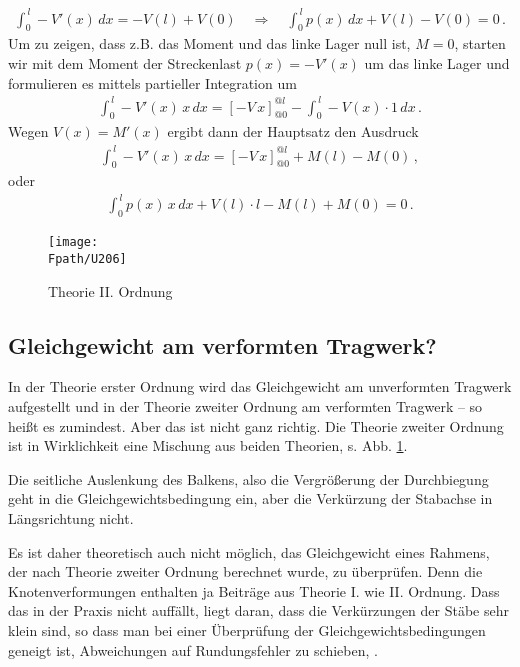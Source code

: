 {{{{{\begin{align}
\int_0^{\,l} -V'(x)\,dx = - V(l) + V(0)\quad \Rightarrow \quad \int_0^{\,l} p(x)\,dx + V(l) - V(0) = 0\,.
\end{align}
Um zu zeigen, dass z.B. das Moment und das linke Lager null ist, $M = 0$, starten wir mit dem Moment der Streckenlast $p(x) = - V'(x)$ um das linke Lager und formulieren es mittels partieller Integration um
\begin{align}
\int_0^{\,l} - V'(x)\,x\,dx = [-V\,x]_{@0}^{@l} - \int_0^{\,l} -V(x)\cdot 1\,dx\,.
\end{align}
Wegen $V(x) = M'(x)$ ergibt dann der Hauptsatz den Ausdruck
\begin{align}
\int_0^{\,l} - V'(x)\,x\,dx = [-V\,x]_{@0}^{@l} + M(l) - M(0)\,,
\end{align}
oder
\begin{align}
\int_0^{\,l} p(x)\,x\,dx + V(l)\cdot l -  M(l) + M(0) = 0\,.
\end{align}
\begin{figure}[tbp]
\centering
\if {} \sidecaption \fi
\centering
\texttt{[image: \\Fpath/U206]}
\caption{Theorie II. Ordnung}
\label{U206}%
\end{figure}%

{\textcolor{sectionTitleBlue}{\section{Gleichgewicht am verformten Tragwerk?}}}
In der Theorie erster Ordnung wird das Gleichgewicht am unverformten Tragwerk aufgestellt und in der Theorie zweiter Ordnung am verformten Tragwerk -- so hei{\ss}t es zumindest. Aber das ist nicht ganz  richtig. Die Theorie zweiter Ordnung ist in Wirklichkeit eine Mischung aus beiden Theorien, s. Abb. \ref{U206}.

Die seitliche Auslenkung des Balkens, also die Vergr\"{o}{\ss}erung der Durchbiegung geht in die Gleichgewichtsbedingung ein, aber die Verk\"{u}rzung der Stabachse in L\"{a}ngsrichtung nicht.

Es ist daher theoretisch auch nicht m\"{o}glich, das Gleichgewicht eines Rahmens, der nach Theorie zweiter Ordnung berechnet wurde, zu \"{u}berpr\"{u}fen. Denn die Knotenverformungen enthalten ja Beitr\"{a}ge aus  Theorie I. wie II. Ordnung. Dass das in der Praxis nicht auff\"{a}llt, liegt daran, dass die Verk\"{u}rzungen der St\"{a}be sehr klein sind, so dass man bei einer \"{U}berpr\"{u}fung der Gleichgewichtsbedingungen geneigt ist, Abweichungen auf Rundungsfehler zu schieben, \cite{HaM2}.


}}}}}
